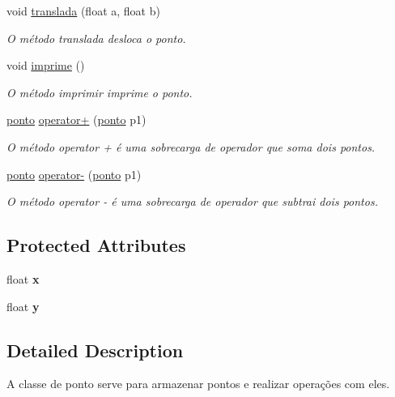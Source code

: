 \begin{DoxyCompactItemize}
void \hyperlink{classponto_a57873357b3df1ba47a54119d9a044a8e}{translada} (float a, float b)
\begin{DoxyCompactList}\small\item\em O método translada desloca o ponto. \end{DoxyCompactList}\item 
void \hyperlink{classponto_adf55fab25fa59c8a688eb1a1011eb2ae}{imprime} ()
\begin{DoxyCompactList}\small\item\em O método imprimir imprime o ponto. \end{DoxyCompactList}\item 
\hyperlink{classponto}{ponto} \hyperlink{classponto_a585911779a41b216f7660daab8bb29b6}{operator+} (\hyperlink{classponto}{ponto} p1)
\begin{DoxyCompactList}\small\item\em O método operator + é uma sobrecarga de operador que soma dois pontos. \end{DoxyCompactList}\item 
\hyperlink{classponto}{ponto} \hyperlink{classponto_ac93e2f8f8fac63679b4446693e31139d}{operator-\/} (\hyperlink{classponto}{ponto} p1)
\begin{DoxyCompactList}\small\item\em O método operator -\/ é uma sobrecarga de operador que subtrai dois pontos. \end{DoxyCompactList}\end{DoxyCompactItemize}
\subsection*{Protected Attributes}
\begin{DoxyCompactItemize}
\item 
float {\bfseries x}\hypertarget{classponto_a5ab2f6400e904f54dabfffe45b3001df}{}\label{classponto_a5ab2f6400e904f54dabfffe45b3001df}

\item 
float {\bfseries y}\hypertarget{classponto_a6c2bb55c1dabf042c072426759d33f40}{}\label{classponto_a6c2bb55c1dabf042c072426759d33f40}

\end{DoxyCompactItemize}


\subsection{Detailed Description}
A classe de ponto serve para armazenar pontos e realizar operações com eles. 

